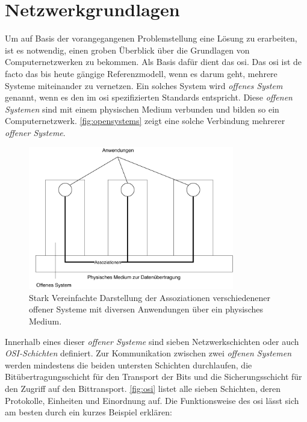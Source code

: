\documentclass[titlepage]{report}
\begin{document}
\section{Netzwerkgrundlagen}
Um auf Basis der vorangegangenen Problemstellung eine Lösung zu
erarbeiten, ist es notwendig, einen groben Überblick über die Grundlagen
von Computernetzwerken zu bekommen. Als Basis dafür dient das \gls{osi}. Das
\gls{osi} ist de facto das bis heute gängige Referenzmodell, wenn es
darum geht, mehrere Systeme miteinander zu vernetzen. Ein solches System
wird \emph{offenes System} genannt, wenn es den im \gls{osi}
spezifizierten Standards entspricht\cite[Siehe Abschnitt
4.1.2]{ITUOSI}. Diese \emph{offenen Systemen} sind mit einem physischen
Medium verbunden und bilden so ein Computernetzwerk. \autoref{fig:opensystems}
zeigt eine solche Verbindung mehrerer \emph{offener Systeme}.
\begin{figure}[H]
    \centering
    \includegraphics[width=0.8\textwidth]{figures/open_systems.pdf}
    \caption{Stark Vereinfachte Darstellung der Assoziationen verschiedenener offener
    Systeme mit diversen Anwendungen über ein physisches Medium.}\label{fig:opensystems}
\end{figure}
Innerhalb eines dieser \emph{offener Systeme} sind sieben
Netzwerkschichten oder auch \emph{OSI-Schichten} definiert\cite[Siehe
Abschnitt 6.1.2]{ITUOSI}. Zur
Kommunikation zwischen zwei \emph{offenen Systemen} werden mindestens
die beiden untersten Schichten durchlaufen, die Bitübertragungsschicht
für den Transport der Bits und die Sicherungsschicht für den Zugriff auf
den Bittransport.
\autoref{fig:osi} listet alle sieben Schichten, deren Protokolle,
Einheiten und Einordnung auf. Die Funktionsweise des \gls{osi} lässt
sich am besten durch ein kurzes Beispiel erklären:
\end{document}
